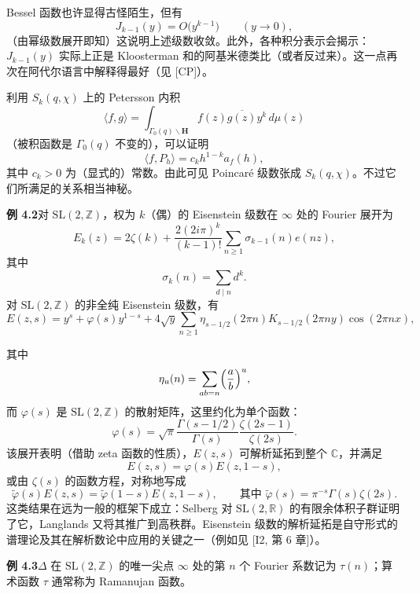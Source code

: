 Bessel 函数也许显得古怪陌生，但有
\[
J_{k-1}(y)=O\bigl(y^{k-1}\bigr)\qquad(y\to0),
\]
（由幂级数展开即知）这说明上述级数收敛。此外，各种积分表示会揭示：$J_{k-1}(y)$ 实际上正是 Kloosterman 和的阿基米德类比（或者反过来）。这一点再次在阿代尔语言中解释得最好（见 [CP]）。

利用 $S_{k}(q,\chi)$ 上的 Petersson 内积
\begin{equation}\tag{4.5}\label{c3:eq:4.5}
\langle f,g\rangle=\int_{\Gamma_{0}(q)\backslash\mathbf{H}}f(z)\overline{g(z)}y^{k}\,d\mu(z)
\end{equation}
（被积函数是 $\Gamma_{0}(q)$ 不变的），可以证明
\[
\langle f,P_{h}\rangle=c_{k}h^{1-k}a_{f}(h),
\]
其中 $c_{k}>0$ 为（显式的）常数。由此可见 Poincaré 级数张成 $S_{k}(q,\chi)$。不过它们所满足的关系相当神秘。

\par\medskip\noindent\textbf{例 4.2}\quad 对 $\mathrm{SL}(2,\mathbb{Z})$，权为 $k$（偶）的 Eisenstein 级数在 $\infty$ 处的 Fourier 展开为
\begin{equation}\tag{4.6}\label{c3:eq:4.6}
E_{k}(z)=2\zeta(k)+\frac{2(2i\pi)^{k}}{(k-1)!}\sum_{n\ge1}\sigma_{k-1}(n)e(nz),
\end{equation}
其中
\[
\sigma_{k}(n)=\sum_{d\mid n}d^{k}.
\]
对 $\mathrm{SL}(2,\mathbb{Z})$ 的非全纯 Eisenstein 级数，有
\[
E(z,s)=y^{s}+\varphi(s)y^{1-s}+4\sqrt{y}\sum_{n\ge1}\eta_{s-1/2}(2\pi n)K_{s-1/2}(2\pi ny)\cos(2\pi nx),
\]

其中
\[
\eta_{u}(n)=\sum_{ab=n}\Bigl(\frac{a}{b}\Bigr)^{u},
\]
而 $\varphi(s)$ 是 $\mathrm{SL}(2,\mathbb{Z})$ 的散射矩阵，这里约化为单个函数：
\[
\varphi(s)=\sqrt{\pi}\frac{\Gamma(s-1/2)}{\Gamma(s)}\frac{\zeta(2s-1)}{\zeta(2s)}.
\]
该展开表明（借助 zeta 函数的性质），$E(z,s)$ 可解析延拓到整个 $\mathbb{C}$，并满足
\[
E(z,s)=\varphi(s)E(z,1-s),
\]
或由 $\zeta(s)$ 的函数方程，对称地写成
\begin{equation}\tag{4.7}\label{c3:eq:4.7}
\tilde{\varphi}(s)E(z,s)=\tilde{\varphi}(1-s)E(z,1-s),\qquad\text{其中 }\tilde{\varphi}(s)=\pi^{-s}\Gamma(s)\zeta(2s).
\end{equation}
这类结果在远为一般的框架下成立：Selberg 对 $\mathrm{SL}(2,\mathbb{R})$ 的有限余体积子群证明了它，Langlands 又将其推广到高秩群。Eisenstein 级数的解析延拓是自守形式的谱理论及其在解析数论中应用的关键之一（例如见 [I2, 第 6 章]）。

\par\medskip\noindent\textbf{例 4.3}\quad $\Delta$ 在 $\mathrm{SL}(2,\mathbb{Z})$ 的唯一尖点 $\infty$ 处的第 $n$ 个 Fourier 系数记为 $\tau(n)$；算术函数 $\tau$ 通常称为 Ramanujan 函数。

